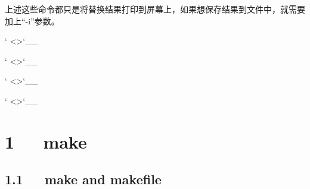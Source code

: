 \documentclass[letterpaper,12pt,english]{sphinxmanual}
\begin{document}
上述这些命令都只是将替换结果打印到屏幕上，如果想保存结果到文件中，就需要加上“-i”参数。

{}` \textless{}\textgreater{}{}`\_\_

{}` \textless{}\textgreater{}{}`\_\_

{}` \textless{}\textgreater{}{}`\_\_

{}` \textless{}\textgreater{}{}`\_\_


\chapter{1   make}
\label{\detokenize{001software/001install/make:make}}\label{\detokenize{001software/001install/make::doc}}

\section{1.1   make and makefile}
\label{\detokenize{001software/001install/make:make-and-makefile}}
\end{document}
